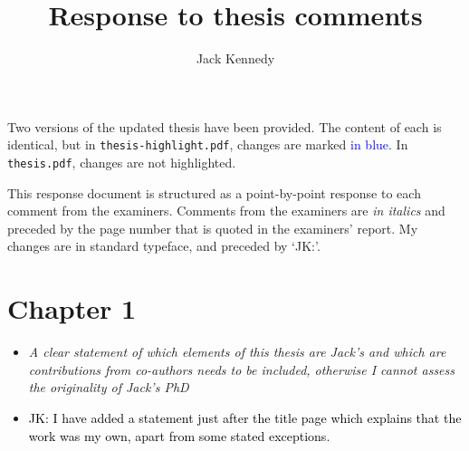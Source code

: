 \documentclass[12pt]{article}
\newcommand{\done}[2]{\item[#1]\textit{#2}}
\newcommand{\jack}[1]{\item{\textcolor{black}{JK: #1}}}
\begin{document}


\title{Response to thesis comments}%
\author{Jack Kennedy} %

\maketitle

Two versions of the updated thesis have been provided. The content of each is identical, but in \texttt{thesis-highlight.pdf}, changes are marked \textcolor{blue}{in blue}. In \texttt{thesis.pdf}, changes are not highlighted.

This response document is structured as a point-by-point response to each comment from the examiners. Comments from the examiners are \textit{in italics} and preceded by the page number that is quoted in the examiners' report. My changes are in standard typeface, and preceded by `JK:'.

\section{Chapter 1}
\begin{itemize}
\done{P3}{A clear statement of which elements of this thesis are Jack’s and which are contributions from co-authors needs to be included, otherwise I cannot assess the originality of Jack’s PhD}

\jack{I have added a statement just after the title page which explains that the work was my own, apart from some stated exceptions.}
\end{itemize}
\newpage
\end{document}
